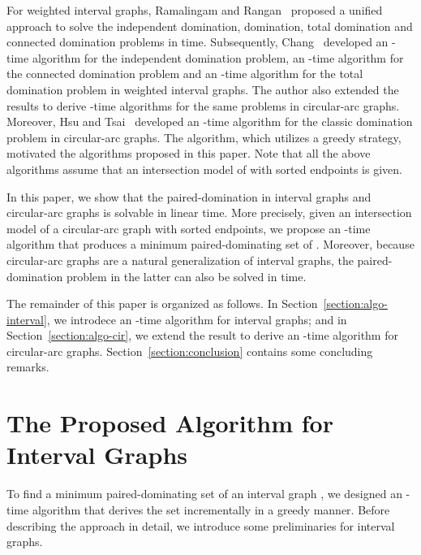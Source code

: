 \documentclass[12pt]{article}
\begin{document}
For weighted interval graphs, Ramalingam and
Rangan~\cite{Ramalingam88} proposed a unified approach to solve
the independent domination, domination, total domination and
connected domination problems in  time. Subsequently,
Chang~\cite{Chang98} developed an -time algorithm for the
independent domination problem, an -time algorithm for the
connected domination problem and an -time
algorithm for the total domination problem in weighted interval
graphs. The author also extended the results to derive
-time algorithms for the same problems in circular-arc
graphs. Moreover, Hsu and Tsai~\cite{HT91} developed an
-time algorithm for the classic domination problem in
circular-arc graphs. The algorithm, which utilizes a greedy
strategy, motivated the algorithms proposed in this paper. Note
that all the above algorithms assume that an intersection model of
 with sorted endpoints is given.

In this paper, we show that the paired-domination in interval
graphs and circular-arc graphs is solvable in linear time. More
precisely, given an intersection model of a circular-arc graph 
with sorted endpoints, we propose an -time algorithm that
produces a minimum paired-dominating set of . Moreover, because
circular-arc graphs are a natural generalization of interval
graphs, the paired-domination problem in the latter can also be
solved in  time.

The remainder of this paper is organized as follows. In
Section~\ref{section:algo-interval}, we introdece an -time
algorithm for interval graphs; and in
Section~\ref{section:algo-cir}, we extend the result to derive an
-time algorithm for circular-arc graphs.
Section~\ref{section:conclusion} contains some concluding remarks.


\section{The Proposed Algorithm for Interval Graphs
                              \label{section:algo-interval}}
To find a minimum paired-dominating set of an interval graph ,
we designed an -time algorithm that derives the set
incrementally in a greedy manner. Before describing the approach
in detail, we introduce some preliminaries for interval graphs.
\end{document}
